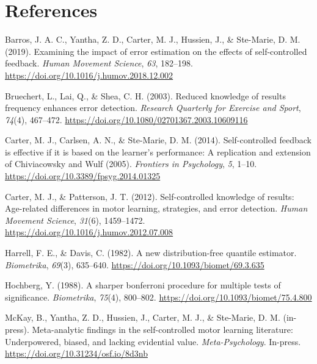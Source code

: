 \documentclass[
  doc, donotrepeattitle,floatsintext]{apa7}
\newlength{\cslhangindent}
\newlength{\cslentryspacingunit} %
\newenvironment{CSLReferences}[2] %
 {%
  \setlength{\parindent}{0pt}
  \ifodd #1
  \let\oldpar\par
  \def\par{\hangindent=\cslhangindent\oldpar}
  \fi
  \setlength{\parskip}{#2\cslentryspacingunit}
 }%
 {}
\begin{document}
\newpage

\hypertarget{references}{%
\section{References}\label{references}}

\vspace{2ex}

\hypertarget{refs}{}
\begin{CSLReferences}{1}{0}
\leavevmode{}%
Barros, J. A. C., Yantha, Z. D., Carter, M. J., Hussien, J., \& Ste-Marie, D. M. (2019). Examining the impact of error estimation on the effects of self-controlled feedback. \emph{Human Movement Science}, \emph{63}, 182--198. \url{https://doi.org/10.1016/j.humov.2018.12.002}

\leavevmode{}%
Bruechert, L., Lai, Q., \& Shea, C. H. (2003). Reduced knowledge of results frequency enhances error detection. \emph{Research Quarterly for Exercise and Sport}, \emph{74}(4), 467--472. \url{https://doi.org/10.1080/02701367.2003.10609116}

\leavevmode{}%
Carter, M. J., Carlsen, A. N., \& Ste-Marie, D. M. (2014). Self-controlled feedback is effective if it is based on the learner's performance: A replication and extension of {Chiviacowsky} and {Wulf} (2005). \emph{Frontiers in Psychology}, \emph{5}, 1--10. \url{https://doi.org/10.3389/fpsyg.2014.01325}

\leavevmode{}%
Carter, M. J., \& Patterson, J. T. (2012). Self-controlled knowledge of results: {Age-related} differences in motor learning, strategies, and error detection. \emph{Human Movement Science}, \emph{31}(6), 1459--1472. \url{https://doi.org/10.1016/j.humov.2012.07.008}

\leavevmode{}%
Harrell, F. E., \& Davis, C. (1982). A new distribution-free quantile estimator. \emph{Biometrika}, \emph{69}(3), 635--640. \url{https://doi.org/10.1093/biomet/69.3.635}

\leavevmode{}%
Hochberg, Y. (1988). A sharper bonferroni procedure for multiple tests of significance. \emph{Biometrika}, \emph{75}(4), 800--802. \url{https://doi.org/10.1093/biomet/75.4.800}

\leavevmode{}%
McKay, B., Yantha, Z. D., Hussien, J., Carter, M. J., \& Ste-Marie, D. M. (in-press). Meta-analytic findings in the self-controlled motor learning literature: {Underpowered}, biased, and lacking evidential value. \emph{Meta-Psychology}. In-press. \url{https://doi.org/10.31234/osf.io/8d3nb}


\end{CSLReferences}
\end{document}
